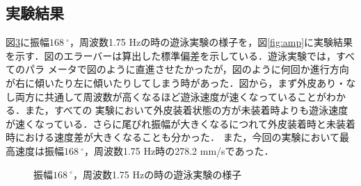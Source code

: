 \subsection{実験結果}
図\ref{fig:test_swim}に振幅$168\:^\circ$，周波数1.75 Hzの時の遊泳実験の様子を，図\ref{fig:amp}に実験結果を示す．図のエラーバーは算出した標準偏差を示している．遊泳実験では，すべてのパラ
メータで図のように直進させたかったが，図のように何回か進行方向が右に傾いたり左に傾いたりしてしまう時があった．図から，まず外皮あり・なし両方に共通して周波数が高くなるほど遊泳速度が速くなっていることがわかる．また，すべての
実験において外皮装着状態の方が未装着時よりも遊泳速度が速くなっている．さらに尾びれ振幅が大きくなるにつれて外皮装着時と未装着時における速度差が大きくなることも分かった．
また，今回の実験において最高速度は振幅$168\:^\circ$，周波数1.75 Hz時の278.2 mm/sであった．

\begin{figure}[hb]
   \centering  
   \begin{subfigure}[b]{1\linewidth}
       \centering
       \label{fig:str}
   \end{subfigure}
   \begin{subfigure}[b]{1\linewidth}
       \centering
       \label{fig:right}
   \end{subfigure}
   \caption{振幅$168\:^\circ$，周波数1.75 Hzの時の遊泳実験の様子}
   \label{fig:test_swim}
\end{figure}

